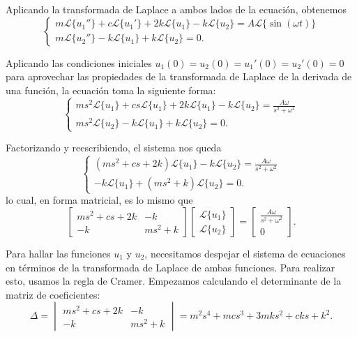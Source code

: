 Aplicando la transformada de Laplace a ambos lados de la ecuación, obtenemos
\[
    \begin{cases}
        m\mathcal{L}\{u_1''\} + c\mathcal{L}\{u_1'\} + 2k\mathcal{L}\{u_1\} - k\mathcal{L}\{u_2\} = A\mathcal{L}\{\sin(\omega t)\} \\
        m\mathcal{L}\{u_2''\} - k\mathcal{L}\{u_1\} + k\mathcal{L}\{u_2\}= 0
    .\end{cases}
\]

Aplicando las condiciones iniciales \(u_1(0) = u_2(0) = u_1'(0) = u_2'(0) = 0\) para aprovechar las propiedades de la transformada de Laplace de la derivada de una función, la ecuación toma la siguiente forma:
\[
    \begin{cases}
        ms^2\mathcal{L}\{u_1\} + cs\mathcal{L}\{u_1\} + 2k\mathcal{L}\{u_1\} - k\mathcal{L}\{u_2\} = \frac{A\omega}{s^2+\omega^2} \\
        ms^2\mathcal{L}\{u_2\} - k\mathcal{L}\{u_1\} + k\mathcal{L}\{u_2\}= 0
    .\end{cases}
\]

Factorizando y reescribiendo, el sistema nos queda
\[
    \begin{cases}
        (ms^2+cs+2k)\mathcal{L}\{u_1\} - k\mathcal{L}\{u_2\} = \frac{A\omega}{s^2+\omega^2} \\
        - k\mathcal{L}\{u_1\} + (ms^2+k)\mathcal{L}\{u_2\} = 0
    .\end{cases}
\]
lo cual, en forma matricial, es lo mismo que
\[
    \begin{bmatrix}
        ms^2+cs+2k & -k \\
        -k & ms^2+k
    \end{bmatrix} \begin{bmatrix} \mathcal{L}\{u_1\} \\ \mathcal{L}\{u_2\} \end{bmatrix}
    = \begin{bmatrix} \frac{A\omega}{s^2+\omega^2} \\ 0 \end{bmatrix}
.\]

Para hallar las funciones \(u_1\) y \(u_2\), necesitamos despejar el sistema de ecuaciones en términos de la transformada de Laplace de ambas funciones. Para realizar esto, usamos la regla de Cramer. Empezamos calculando el determinante de la matriz de coeficientes:
\[
    \Delta = \begin{vmatrix}
        ms^2+cs+2k & -k \\
        -k & ms^2+k
    \end{vmatrix} = m^2s^4+mcs^3+3mks^2+cks+k^2.
\]

